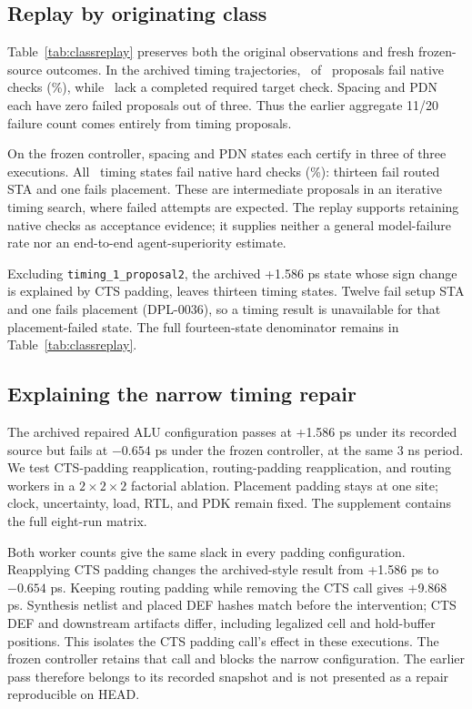 \documentclass[runningheads]{llncs}
\newcommand{\code}[1]{\texttt{#1}}
\begin{document}
\subsection{Replay by originating class}
Table~\ref{tab:classreplay} preserves both the original observations and fresh
frozen-source outcomes. In the archived timing trajectories, \ArchivedTimingWrong\
of \TimingProposalCount\ proposals fail native checks (\ArchivedTimingWrongPct\%),
while \ArchivedTimingMissing\ lack a completed required target check. Spacing
and PDN each have zero failed proposals out of three. Thus the earlier aggregate
11/20 failure count comes entirely from timing proposals.


On the frozen controller, spacing and PDN states each certify in three of
three executions. All \FrozenTimingWrong\ timing states fail native hard
checks (\FrozenTimingWrongPct\%): thirteen fail routed STA and one fails
placement. These are intermediate proposals in an iterative timing search,
where failed attempts are expected. The replay supports retaining native
checks as acceptance evidence; it supplies neither a general model-failure
rate nor an end-to-end agent-superiority estimate.

Excluding \code{timing\_1\_proposal2}, the archived +1.586 ps state
whose sign change is explained by CTS padding, leaves thirteen timing states.
Twelve fail setup STA and one fails placement (DPL-0036), so a timing result
is unavailable for that placement-failed state. The full fourteen-state
denominator remains in Table~\ref{tab:classreplay}.

\subsection{Explaining the narrow timing repair}
The archived repaired ALU configuration passes at +1.586 ps under its
recorded source but fails at $-0.654$ ps under the frozen controller, at the
same 3 ns period. We test CTS-padding reapplication, routing-padding
reapplication, and routing workers in a $2\times2\times2$ factorial ablation.
Placement padding stays at one site; clock, uncertainty, load, RTL, and PDK
remain fixed. The supplement contains the full eight-run matrix.

Both worker counts give the same slack in every padding configuration.
Reapplying CTS padding changes the archived-style result from +1.586 ps to
$-0.654$ ps. Keeping routing padding while removing the CTS call gives
+9.868 ps. Synthesis netlist and placed DEF hashes match before the intervention;
CTS DEF and downstream artifacts differ, including legalized cell and hold-buffer
positions. This isolates the CTS padding call's effect in these executions.
The frozen controller retains that call and blocks the narrow configuration.
The earlier pass therefore belongs to its recorded snapshot and is not
presented as a repair reproducible on HEAD.
\end{document}
